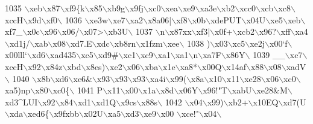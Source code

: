 \begin{DoxyCode}
{1035 \textcolor{stringliteral}{\(\backslash\)xeb\(\backslash\)x87\(\backslash\)xf9\{k\(\backslash\)x85\(\backslash\)xb9g\(\backslash\)x9fj\(\backslash\)xc0\(\backslash\)xea\(\backslash\)xe9\(\backslash\)xa3e\(\backslash\)xb2\(\backslash\)xcc0\(\backslash\)xcb\(\backslash\)xc8\(\backslash\)xccH\(\backslash\)x9d\(\backslash\)xf0\(\backslash\)}
1036 \textcolor{stringliteral}{\(\backslash\)xe3w\(\backslash\)xe7\(\backslash\)xa2\(\backslash\)x8a06|\(\backslash\)xf8\(\backslash\)x0b\(\backslash\)xdePUT\(\backslash\)x04U\(\backslash\)xe5\(\backslash\)xeb\(\backslash\)xf7\_\(\backslash\)x0c\(\backslash\)x96\(\backslash\)x06/\(\backslash\)x07>\(\backslash\)xb3U\(\backslash\)}
1037 \textcolor{stringliteral}{\(\backslash\)n\(\backslash\)x87xx\(\backslash\)xf3|\(\backslash\)x0f+\(\backslash\)xcb2\(\backslash\)x96?\(\backslash\)xff\(\backslash\)xa4\(\backslash\)xd1j/\(\backslash\)xab\(\backslash\)x08\(\backslash\)xd7.E\(\backslash\)xdc\(\backslash\)xb8rn\(\backslash\)x1fzm\(\backslash\)xee\(\backslash\)}
1038 \textcolor{stringliteral}{)\(\backslash\)x03\(\backslash\)xc5\(\backslash\)xe2j\(\backslash\)x00`f\(\backslash\)x00lll`\(\backslash\)xd6\(\backslash\)xad435\(\backslash\)xc5\(\backslash\)xd9#\(\backslash\)xc1\(\backslash\)xc9\(\backslash\)xa1\(\backslash\)xa1\(\backslash\)n\(\backslash\)xa7F\(\backslash\)x86Y\(\backslash\)}
1039 \textcolor{stringliteral}{\_\_\(\backslash\)xc7\(\backslash\)xccH\(\backslash\)x92\(\backslash\)x84z\(\backslash\)xbd\(\backslash\)x8es)\(\backslash\)xe2\(\backslash\)x06\(\backslash\)xba\(\backslash\)x1e\(\backslash\)xa8*\(\backslash\)x00Q\(\backslash\)x14af\(\backslash\)x88\(\backslash\)x08\(\backslash\)xadV\(\backslash\)}
1040 \textcolor{stringliteral}{\(\backslash\)x8b\(\backslash\)xd6\(\backslash\)xe6&\(\backslash\)x93\(\backslash\)x93\(\backslash\)x93\(\backslash\)xa4i\(\backslash\)x99(\(\backslash\)x8a\(\backslash\)x10\(\backslash\)x11\(\backslash\)xe28\(\backslash\)x06\(\backslash\)xc0\(\backslash\)xa5)np\(\backslash\)x80\(\backslash\)xc0\{\(\backslash\)}
1041 \textcolor{stringliteral}{P\(\backslash\)x11\(\backslash\)x00\(\backslash\)x1a\(\backslash\)x8d\(\backslash\)x06Y\(\backslash\)x96!"T\(\backslash\)xabU\(\backslash\)xe28&M\(\backslash\)xd3^LUI\(\backslash\)x92\(\backslash\)x84\(\backslash\)xd1\(\backslash\)xd1Q\(\backslash\)x9cs\(\backslash\)x88s\(\backslash\)}
1042 \textcolor{stringliteral}{\(\backslash\)x04\(\backslash\)x99)\(\backslash\)xb2+\(\backslash\)x10EQ\(\backslash\)xd7(U\(\backslash\)xda\(\backslash\)xed6\{\(\backslash\)x9fxbb\(\backslash\)x02U\(\backslash\)xa5\(\backslash\)xd3\(\backslash\)xe9\(\backslash\)x00 \(\backslash\)xce!"\(\backslash\)x04\(\backslash\)}
}
\end{DoxyCode}

